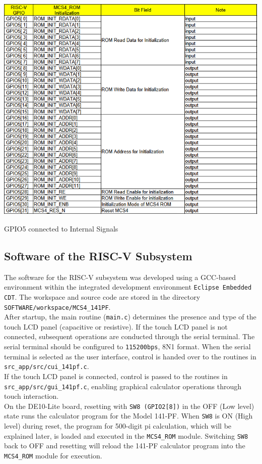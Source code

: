 \begin{table}
    \includegraphics[width=0.75\columnwidth]{./Table/INTGPIO5.png}
    \caption{GPIO5 connected to Internal Signals}
    \label{tb:INTGPIO5}
\end{table}

\subsection{Software of the RISC-V Subsystem}
The software for the RISC-V subsystem was developed using a GCC-based environment within the integrated development environment \texttt{Eclipse Embedded CDT}. The workspace and source code are stored in the directory \texttt{SOFTWARE/workspace/MCS4\_141PF}.\\

After startup, the main routine (\texttt{main.c}) determines the presence and type of the touch LCD panel (capacitive or resistive). If the touch LCD panel is not connected, subsequent operations are conducted through the serial terminal. The serial terminal should be configured to \texttt{115200bps}, 8N1 format. When the serial terminal is selected as the user interface, control is handed over to the routines in \texttt{src\_app/src/cui\_141pf.c}.\\

If the touch LCD panel is connected, control is passed to the routines in \texttt{src\_app/src/gui\_141pf.c}, enabling graphical calculator operations through touch interaction.\\

On the DE10-Lite board, resetting with \texttt{SW8 (GPIO2[8])} in the OFF (Low level) state runs the calculator program for the Model 141-PF. When \texttt{SW8} is ON (High level) during reset, the program for 500-digit pi calculation, which will be explained later, is loaded and executed in the \texttt{MCS4\_ROM} module. Switching \texttt{SW8} back to OFF and resetting will reload the 141-PF calculator program into the \texttt{MCS4\_ROM} module for execution.\\

